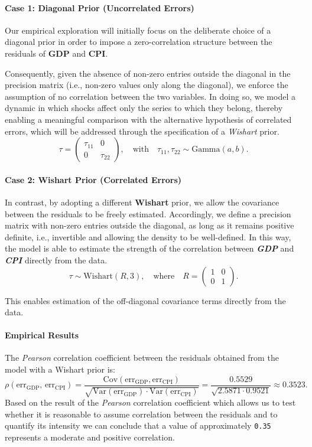 \documentclass{Configuration_Files/PoliMi3i_thesis}
\begin{document}
\paragraph{Case 1: Diagonal Prior (Uncorrelated Errors)}
Our empirical exploration will initially focus on the deliberate choice of a diagonal prior in order to impose a zero-correlation structure between the residuals of \textbf{GDP} and \textbf{CPI}. 

Consequently, given the absence of non-zero entries outside the diagonal in the precision matrix (i.e., non-zero values only along the diagonal), we enforce the assumption of no correlation between the two variables. In doing so, we model a dynamic in which shocks affect only the series to which they belong, thereby enabling a meaningful comparison with the alternative hypothesis of correlated errors, which will be addressed through the specification of a \textit{Wishart} prior.
\[
\tau =
\begin{pmatrix}
\tau_{11} & 0 \\
0 & \tau_{22}
\end{pmatrix}, 
\quad \text{with} \quad
\tau_{11}, \tau_{22} \sim \text{Gamma}(a, b).
\]

\paragraph{Case 2: Wishart Prior (Correlated Errors)}
In contrast, by adopting a different \textbf{Wishart} prior, we allow the covariance between the residuals to be freely estimated. Accordingly, we define a precision matrix with non-zero entries outside the diagonal, as long as it remains positive definite, i.e., invertible and allowing the density to be well-defined. In this way, the model is able to estimate the strength of the correlation between \textbf{\textit{GDP}} and \textbf{\textit{CPI}} directly from the data. 
\[
\tau \sim \text{Wishart}(R, 3), \quad \text{where} \quad
R = \begin{pmatrix}
1 & 0 \\
0 & 1
\end{pmatrix}.
\]

This enables estimation of the off-diagonal covariance terms directly from the data.

\paragraph{Empirical Results}
The \textit{Pearson} correlation coefficient between the residuals obtained from the model with a Wishart prior is:
\[
\rho(\text{err}_{\mathrm{GDP}},\,\text{err}_{\mathrm{CPI}}) 
= \frac{\text{Cov}(\text{err}_{\mathrm{GDP}}, \text{err}_{\mathrm{CPI}})}{
\sqrt{\text{Var}(\text{err}_{\mathrm{GDP}}) \cdot \text{Var}(\text{err}_{\mathrm{CPI}})}} 
= \frac{0.5529}{\sqrt{2.5871 \cdot 0.9521}} \approx 0.3523.
\]
Based on the result of the \textit{Pearson} correlation coefficient which allows us to test whether it is reasonable to assume correlation between the residuals and to quantify its intensity we can conclude that a value of approximately \texttt{0.35} represents a moderate and positive correlation.
\end{document}
